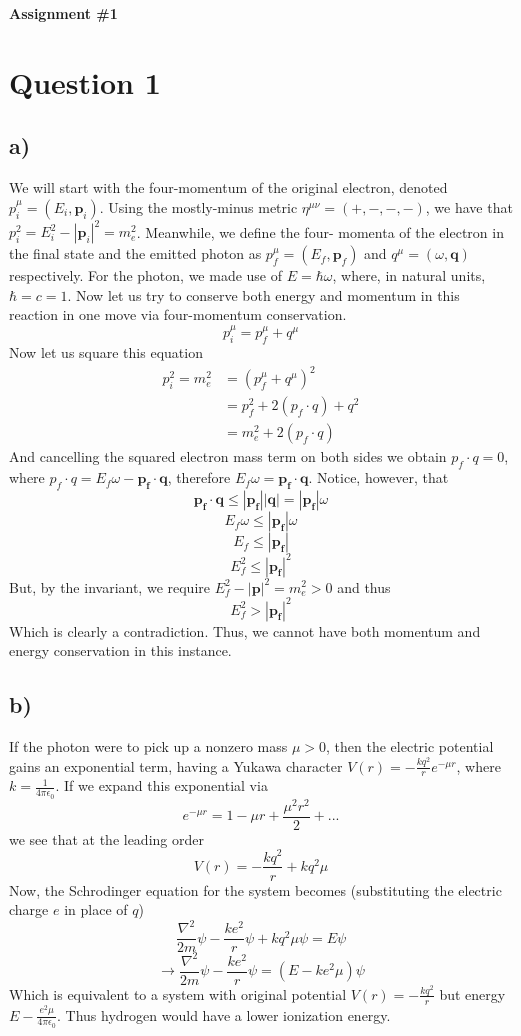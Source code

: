 \documentclass[12pt]{article}
\begin{document}
\begin{center}
    \Large \textbf{Assignment \#1}
\end{center}
\vspace{1cm}

\section*{Question 1}
\subsection*{a)}
We will start with the four-momentum of the original electron, denoted
$p^{\mu}_i = (E_i, \bm{p}_i)$. Using the mostly-minus metric 
$\eta^{\mu\nu} = (+, -, -, -)$, we have that 
$p_i^2 = E_i^2 - |\bm{p}_i|^2 = m_e^2$.
Meanwhile, we define the four- momenta of the electron in the final state and
the emitted photon as $p^{\mu}_f = (E_f, \bm{p}_f)$ and $q^{\mu} = (\omega,
\bm{q})$ respectively. For the photon, we made use of $E = \hbar \omega$,
where, in natural units, $\hbar = c = 1$. Now let us try to conserve both
energy and momentum in this reaction in one move via four-momentum
conservation.
$$ p_i^{\mu} = p_f^{\mu} + q^{\mu} $$
Now let us square this equation
\begin{align}
    p^2_i = m_e^2 &= (p_f^{\mu} + q^{\mu})^2 \\
         &= p_f^2 + 2(p_f \cdot q) + q^2 \\
         &= m_e^2 + 2(p_f \cdot q)
\end{align}
And cancelling the squared electron mass term on both sides we obtain 
$p_f \cdot q = 0$, where $p_f \cdot q = E_f\omega - \bm{p_f}\cdot\bm{q}$, therefore
$E_f\omega = \bm{p_f}\cdot\bm{q}$. Notice, however, that 
$$\bm{p_f}\cdot\bm{q} \leq |\bm{p_f}||\bm{q}| = |\bm{p_f}|\omega$$
$$E_f\omega \leq |\bm{p_f}|\omega$$
$$E_f \leq |\bm{p_f}|$$
$$E_f^2 \leq |\bm{p_f}|^2$$
But, by the invariant, we require $E_f^2 - |\bm{p}|^2 = m_e^2 > 0$ and thus 
$$E_f^2 > |\bm{p_f}|^2$$
Which is clearly a contradiction. Thus, we cannot have both momentum and energy
conservation in this instance.

\subsection*{b)}
If the photon were to pick up a nonzero mass $\mu > 0$, then the electric
potential gains an exponential term, having a Yukawa character $V(r) =
-\frac{kq^2}{r}e^{-\mu r}$, where $k = \frac{1}{4\pi\epsilon_0}$. If we expand
this exponential via $$ e^{-\mu r} = 1 - \mu r + \frac{\mu^2 r^2}{2} + ...$$
we see that at the leading order
$$ V(r) = -\frac{kq^2}{r} + kq^2\mu $$
Now, the Schrodinger equation for the system becomes (substituting the electric
charge $e$ in place of $q$)
$$ \frac{\nabla^2}{2m}\psi - \frac{ke^2}{r}\psi + kq^2\mu\psi = E\psi $$
$$ \rightarrow  \frac{\nabla^2}{2m}\psi - \frac{ke^2}{r}\psi = (E - ke^2\mu)\psi$$ 
Which is equivalent to a system with original potential $V(r) = -\frac{kq^2}{r}$
but energy $E - \frac{e^2\mu}{4\pi\epsilon_0}$. Thus hydrogen would have a lower
ionization energy.
\end{document}
